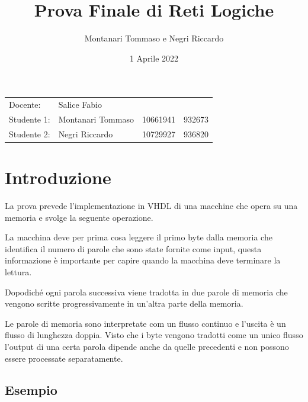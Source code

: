 \documentclass{article}
\title{Prova Finale di Reti Logiche} %
\author{Montanari Tommaso e Negri Riccardo} %
\date{1 Aprile 2022}
\begin{document}
\maketitle %
\begin{center}
\begin{tabular}{l l l l}
Docente: & Salice Fabio & & \\ 
Studente 1: & Montanari Tommaso & 10661941 & 932673\\
Studente 2: & Negri Riccardo & 10729927 & 936820 
\end{tabular}
\end{center}



\section{Introduzione}

La prova prevede l'implementazione in VHDL di una macchine che opera su una memoria e svolge la seguente operazione.

La macchina deve per prima cosa leggere il primo byte dalla memoria che identifica il numero di parole che sono
state fornite come input, questa informazione è importante per capire quando la macchina deve terminare la lettura.

Dopodiché ogni parola successiva viene tradotta in due parole di memoria che vengono scritte progressivamente in un'altra parte della memoria.

Le parole di memoria sono interpretate com un flusso continuo e l'uscita è un flusso di lunghezza doppia. Visto che i byte vengono tradotti come un unico flusso l'output di una certa parola dipende anche da quelle precedenti e non possono essere processate separatamente.

\subsection{Esempio}
\end{document}
